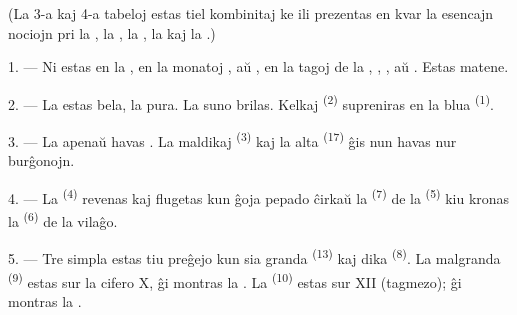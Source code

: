 %

\VUsaut{3.0mm}
\VUsaut{1.6mm}
\VUsaut{3.4mm}

(La 3-a kaj 4-a tabeloj estas tiel kombinitaj ke ili prezentas en kvar
 la esencajn nociojn pri la , la
, la , la  kaj la .)
\VUsaut{4.0mm}

\VUsaut{3.0mm}

\VUsaut{2.4mm}

\VUsaut{3.0mm}

1. --- Ni estas en la , en la monatoj ,
 aŭ , en la tagoj de la ,
, , aŭ . Estas  matene.

2. --- La  estas bela, la  pura. La suno brilas.
Kelkaj  \textsuperscript{(2)} supreniras en la blua
 \textsuperscript{(1)}.

3. --- La  apenaŭ havas . La maldikaj
 \textsuperscript{(3)} kaj la alta 
\textsuperscript{(17)} ĝis nun havas nur burĝonojn.

4. --- La  \textsuperscript{(4)} revenas kaj flugetas kun
ĝoja pepado ĉirkaŭ la  \textsuperscript{(7)} de la
 \textsuperscript{(5)} kiu kronas la 
\textsuperscript{(6)} de la vilaĝo.

\VUsaut{3.4mm}
\VUsaut{3.0mm}

5. --- Tre simpla estas tiu preĝejo kun sia granda 
\textsuperscript{(13)} kaj dika  \textsuperscript{(8)}. La
malgranda  \textsuperscript{(9)} estas sur la cifero X, ĝi
montras la . La  \textsuperscript{(10)} estas sur
XII (tagmezo); ĝi montras la .

